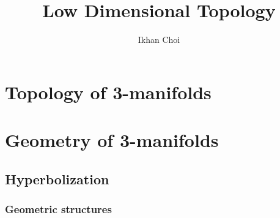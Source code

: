 \documentclass{../../large}
\begin{document}
\title{Low Dimensional Topology}
\author{Ikhan Choi}
\maketitle
\tableofcontents

\part{Topology of 3-manifolds}
\chapter{}
\chapter{}
\chapter{}


\part{Geometry of 3-manifolds}
\chapter{Hyperbolization}
\section{Geometric structures}
\end{document}
